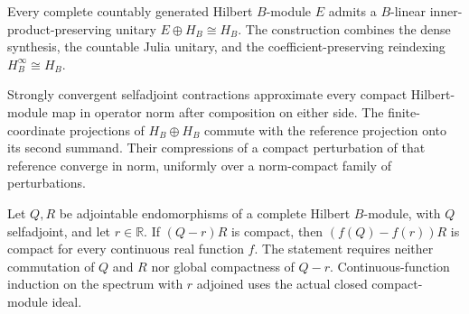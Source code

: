 \begin{proposition}\label{prop:standard-module-stabilization}
\leanok
Every complete countably generated Hilbert $B$-module $E$ admits a
$B$-linear inner-product-preserving unitary $E\oplus H_B\cong H_B$.
The construction combines the dense synthesis, the countable Julia
unitary, and the coefficient-preserving reindexing $H_B^\infty\cong H_B$.
\end{proposition}

\begin{proposition}\label{prop:compact-module-coordinate-cutoffs}
\leanok
Strongly convergent selfadjoint contractions approximate every compact
Hilbert-module map in operator norm after composition on either side.
The finite-coordinate projections of $H_B\oplus H_B$ commute with the
reference projection onto its second summand. Their compressions of a
compact perturbation of that reference converge in norm, uniformly over
a norm-compact family of perturbations.
\end{proposition}

\begin{proposition}\label{prop:localized-module-functional-calculus}
\leanok
Let $Q,R$ be adjointable endomorphisms of a complete Hilbert $B$-module,
with $Q$ selfadjoint, and let $r\in\mathbb R$. If $(Q-r)R$ is compact,
then $(f(Q)-f(r))R$ is compact for every continuous real function $f$.
The statement requires neither commutation of $Q$ and $R$ nor global
compactness of $Q-r$. Continuous-function induction on the spectrum
with $r$ adjoined uses the actual closed compact-module ideal.
\end{proposition}


